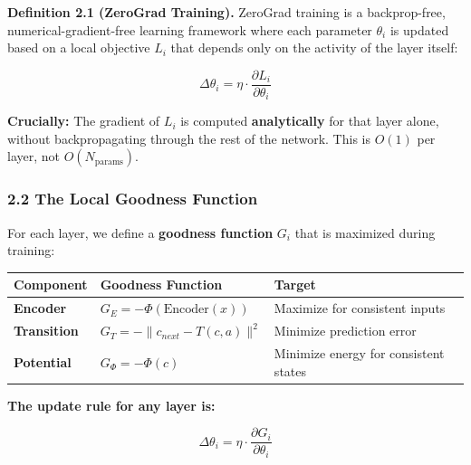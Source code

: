 \documentclass[
  11pt,
  a4paper,
]{article}
\begin{document}
\textbf{Definition 2.1 (ZeroGrad Training).} ZeroGrad training is a
backprop-free, numerical-gradient-free learning framework where each
parameter \(\theta_i\) is updated based on a local objective \(L_i\)
that depends only on the activity of the layer itself:

\[\Delta \theta_i = \eta \cdot \frac{\partial L_i}{\partial \theta_i}\]

\textbf{Crucially:} The gradient of \(L_i\) is computed
\textbf{analytically} for that layer alone, without backpropagating
through the rest of the network. This is \(O(1)\) per layer, not
\(O(N_{\text{params}})\).

\subsubsection{2.2 The Local Goodness
Function}\label{the-local-goodness-function}

For each layer, we define a \textbf{goodness function} \(G_i\) that is
maximized during training:

\begin{longtable}[]{@{}
  >{\raggedright\arraybackslash}p{}
  >{\raggedright\arraybackslash}p{}
  >{\raggedright\arraybackslash}p{}@{}}
\toprule\noalign{}
\begin{minipage}[b]{\linewidth}\raggedright
Component
\end{minipage} & \begin{minipage}[b]{\linewidth}\raggedright
Goodness Function
\end{minipage} & \begin{minipage}[b]{\linewidth}\raggedright
Target
\end{minipage} \\
\midrule\noalign{}
\endhead
\bottomrule\noalign{}
\endlastfoot
\textbf{Encoder} & \(G_E = -\Phi(\text{Encoder}(x))\) & Maximize for
consistent inputs \\
\textbf{Transition} & \(G_T = -\|c_{next} - T(c,a)\|^2\) & Minimize
prediction error \\
\textbf{Potential} & \(G_\Phi = -\Phi(c)\) & Minimize energy for
consistent states \\
\end{longtable}

\textbf{The update rule for any layer is:}

\[\Delta \theta_i = \eta \cdot \frac{\partial G_i}{\partial \theta_i}\]
\end{document}
